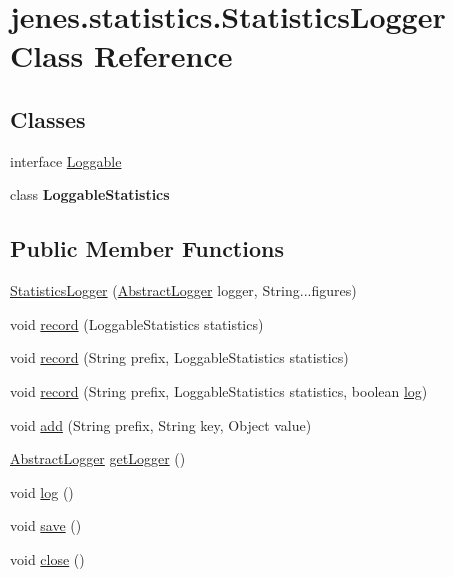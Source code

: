 \hypertarget{classjenes_1_1statistics_1_1_statistics_logger}{\section{jenes.\-statistics.\-Statistics\-Logger Class Reference}
\label{classjenes_1_1statistics_1_1_statistics_logger}
}
\subsection*{Classes}
\begin{DoxyCompactItemize}
\item 
interface \hyperlink{interfacejenes_1_1statistics_1_1_statistics_logger_1_1_loggable}{Loggable}
\item 
class {\bfseries Loggable\-Statistics}
\end{DoxyCompactItemize}
\subsection*{Public Member Functions}
\begin{DoxyCompactItemize}
\item 
\hyperlink{classjenes_1_1statistics_1_1_statistics_logger_ad4bf879bdfb673a6f82f3536fd5557b8}{Statistics\-Logger} (\hyperlink{classjenes_1_1utils_1_1_abstract_logger}{Abstract\-Logger} logger, String...\-figures)
\item 
void \hyperlink{classjenes_1_1statistics_1_1_statistics_logger_a8f7fc89cbbd6c6aad447057cd3eb6dbe}{record} (Loggable\-Statistics statistics)
\item 
void \hyperlink{classjenes_1_1statistics_1_1_statistics_logger_a31acd1617a14ed32519fc5487b30fd25}{record} (String prefix, Loggable\-Statistics statistics)
\item 
void \hyperlink{classjenes_1_1statistics_1_1_statistics_logger_a1e68400e5e02df74005d654dd52a9b34}{record} (String prefix, Loggable\-Statistics statistics, boolean \hyperlink{classjenes_1_1statistics_1_1_statistics_logger_a35539d6c4f5664617185d68c6efdf66a}{log})
\item 
void \hyperlink{classjenes_1_1statistics_1_1_statistics_logger_ac9ee13346b299296f315ad6cf247fdcf}{add} (String prefix, String key, Object value)
\item 
\hyperlink{classjenes_1_1utils_1_1_abstract_logger}{Abstract\-Logger} \hyperlink{classjenes_1_1statistics_1_1_statistics_logger_abd8fdfad668108933aa315c415050d63}{get\-Logger} ()
\item 
void \hyperlink{classjenes_1_1statistics_1_1_statistics_logger_a35539d6c4f5664617185d68c6efdf66a}{log} ()
\item 
void \hyperlink{classjenes_1_1statistics_1_1_statistics_logger_a80cde2facc21c7398050e89131a7321e}{save} ()
\item 
void \hyperlink{classjenes_1_1statistics_1_1_statistics_logger_aae3d375349f86fcd9a7ce450bae3d046}{close} ()
\end{DoxyCompactItemize}
